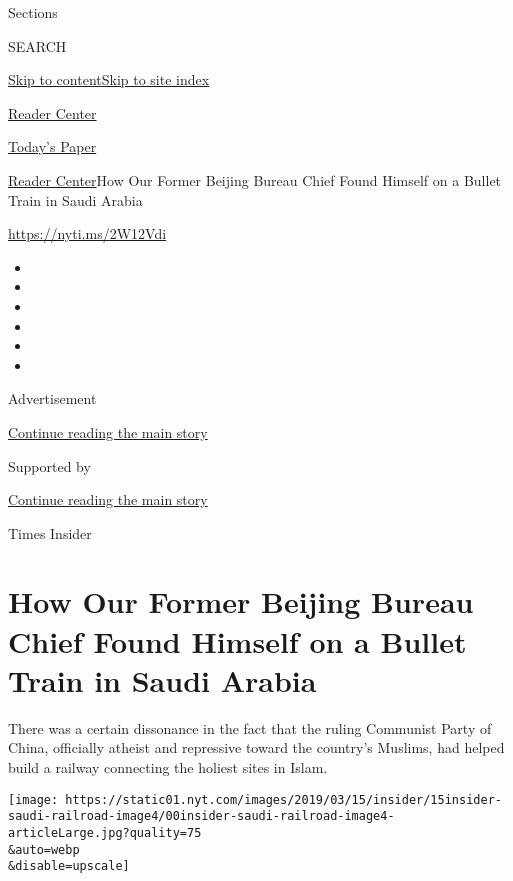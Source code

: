 Sections

SEARCH

\protect\hyperlink{site-content}{Skip to
content}\protect\hyperlink{site-index}{Skip to site index}

\href{https://www.nytimes.com/section/reader-center}{Reader Center}

\href{https://myaccount.nytimes.com/auth/login?response_type=cookie\&client_id=vi}{}

\href{https://www.nytimes.com/section/todayspaper}{Today's Paper}

\href{/section/reader-center}{Reader Center}\textbar{}How Our Former
Beijing Bureau Chief Found Himself on a Bullet Train in Saudi Arabia

\url{https://nyti.ms/2W12Vdi}

\begin{itemize}
\item
\item
\item
\item
\item
\item
\end{itemize}

Advertisement

\protect\hyperlink{after-top}{Continue reading the main story}

Supported by

\protect\hyperlink{after-sponsor}{Continue reading the main story}

Times Insider

\hypertarget{how-our-former-beijing-bureau-chief-found-himself-on-a-bullet-train-in-saudi-arabia}{%
\section{How Our Former Beijing Bureau Chief Found Himself on a Bullet
Train in Saudi
Arabia}\label{how-our-former-beijing-bureau-chief-found-himself-on-a-bullet-train-in-saudi-arabia}}

There was a certain dissonance in the fact that the ruling Communist
Party of China, officially atheist and repressive toward the country's
Muslims, had helped build a railway connecting the holiest sites in
Islam.

\texttt{[image: https://static01.nyt.com/images/2019/03/15/insider/15insider-saudi-railroad-image4/00insider-saudi-railroad-image4-articleLarge.jpg?quality=75\\\&auto=webp\\\&disable=upscale]}

